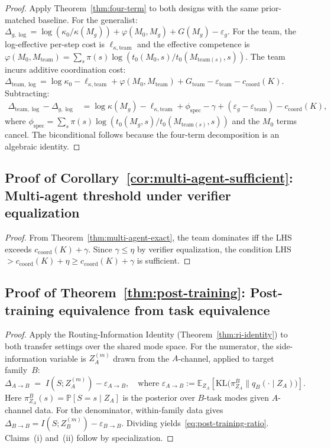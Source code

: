 \documentclass[10pt]{article}
\theoremstyle{paperplain}
\theoremstyle{paperdefinition}
\theoremstyle{paperremark}
\newcommand{\KL}{\mathrm{KL}}
\newcommand{\E}{\mathbb{E}}
\newcommand{\Prb}{\mathbb{P}}
\begin{document}
\begin{proof}
Apply Theorem~\ref{thm:four-term} to both designs with the same prior-matched baseline.
For the generalist: $\Delta_{g,\log} = \log(\kappa_0/\kappa(M_g)) + \varphi(M_0, M_g) + G(M_g) - \varepsilon_g$.
For the team, the log-effective per-step cost is $\ell_{\kappa,\mathrm{team}}$ and the effective competence is $\varphi(M_0, M_{\mathrm{team}}) = \sum_s \pi(s) \log(t_0(M_0,s)/t_0(M_{\mathrm{team}(s)},s))$.
The team incurs additive coordination cost:
$\Delta_{\mathrm{team},\log} = \log\kappa_0-\ell_{\kappa,\mathrm{team}} + \varphi(M_0, M_{\mathrm{team}}) + G_{\mathrm{team}} - \varepsilon_{\mathrm{team}} - c_{\mathrm{coord}}(K)$.
Subtracting:
\begin{align*}
\Delta_{\mathrm{team},\log} - \Delta_{g,\log}
&= \log\kappa(M_g)-\ell_{\kappa,\mathrm{team}}
+ \phi_{\mathrm{spec}}
- \gamma
+ (\varepsilon_g - \varepsilon_{\mathrm{team}})
- c_{\mathrm{coord}}(K),
\end{align*}
where $\phi_{\mathrm{spec}} = \sum_s \pi(s) \log(t_0(M_g,s)/t_0(M_{\mathrm{team}(s)},s))$ and the $M_0$ terms cancel.
The biconditional follows because the four-term decomposition is an algebraic identity.
\end{proof}

\subsection{Proof of Corollary~\ref{cor:multi-agent-sufficient}: Multi-agent threshold under verifier equalization}
\label{app:proof:cor:multi-agent-sufficient}

\begin{proof}
From Theorem~\ref{thm:multi-agent-exact}, the team dominates iff the LHS exceeds $c_{\mathrm{coord}}(K) + \gamma$.
Since $\gamma \le \eta$ by verifier equalization, the condition LHS $> c_{\mathrm{coord}}(K) + \eta \ge c_{\mathrm{coord}}(K) + \gamma$ is sufficient.
\end{proof}

\subsection{Proof of Theorem~\ref{thm:post-training}: Post-training equivalence from task equivalence}
\label{app:proof:thm:post-training}

\begin{proof}
Apply the Routing-Information Identity (Theorem~\ref{thm:ri-identity}) to both transfer settings over the shared mode space.
For the numerator, the side-information variable is $Z_A^{(m)}$ drawn from the $A$-channel, applied to target family~$B$:
\[
\Delta_{A \to B} \;=\; I(S; Z_A^{(m)}) - \varepsilon_{A \to B},
\quad\text{where }
\varepsilon_{A \to B} := \E_{Z_A}\!\left[\KL\bigl(\pi^B_{Z_A} \| q_B(\cdot \mid Z_A)\bigr)\right].
\]
Here $\pi^B_{Z_A}(s) = \Prb[S = s \mid Z_A]$ is the posterior over $B$-task modes given $A$-channel data.
For the denominator, within-family data gives $\Delta_{B \to B} = I(S; Z_B^{(m)}) - \varepsilon_{B \to B}$.
Dividing yields~\eqref{eq:post-training-ratio}.
Claims~(i) and~(ii) follow by specialization.
\end{proof}
\end{document}
